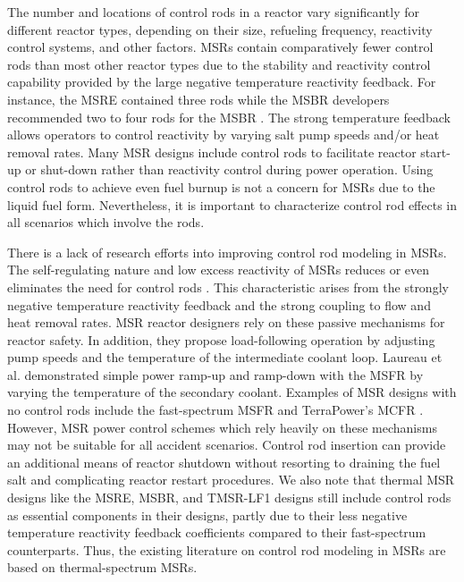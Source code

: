 The number and locations of control rods in a reactor vary significantly for different reactor
types, depending on their size, refueling frequency, reactivity control systems, and other factors.
\glspl{MSR} contain comparatively fewer control rods than most other reactor types due to the
stability and reactivity control capability provided by the large negative temperature
reactivity feedback. For instance, the \gls{MSRE} contained three rods while the \gls{MSBR}
developers recommended two to four rods for the \gls{MSBR} \cite{robertson_msre_1965,
robertson_conceptual_1971}. The
strong temperature feedback allows operators to control reactivity by varying salt pump
speeds and/or heat removal rates. Many \gls{MSR} designs include control rods to facilitate reactor
start-up or shut-down rather than reactivity control during power operation. Using
control rods to achieve even fuel burnup is not a concern for \glspl{MSR} due to the liquid fuel
form. Nevertheless, it is important to characterize control rod effects in all scenarios which
involve the rods.

There is a lack of research efforts into improving control rod modeling in \glspl{MSR}.
The self-regulating nature and low excess reactivity of \glspl{MSR} reduces or even eliminates the
need for control rods \cite{dolan_1_2017}. This characteristic arises from the strongly negative
temperature reactivity feedback and the strong coupling to flow and heat removal rates. \gls{MSR}
reactor designers rely on these passive mechanisms for reactor safety. In addition, they propose
load-following operation by adjusting pump speeds and the temperature of the intermediate coolant
loop. Laureau et al. \cite{laureau_transient_2017} demonstrated simple power ramp-up and ramp-down
with the \gls{MSFR} by varying the temperature of the secondary coolant. Examples of \gls{MSR}
designs with no control rods include the fast-spectrum \gls{MSFR} and TerraPower's \gls{MCFR}
\cite{terrapower_terrapower_2021}. However, \gls{MSR} power control schemes which rely heavily on
these mechanisms may not be suitable for all accident scenarios. Control rod insertion can provide
an additional means of reactor shutdown without resorting to draining the fuel salt and
complicating reactor restart procedures. We also note that thermal \gls{MSR} designs like the
\gls{MSRE}, \gls{MSBR}, and TMSR-LF1 designs still include control rods as essential components in
their designs, partly due to their less negative temperature reactivity feedback coefficients
compared to their fast-spectrum counterparts. Thus, the existing literature on control rod modeling
in \glspl{MSR} are based on thermal-spectrum \glspl{MSR}.

